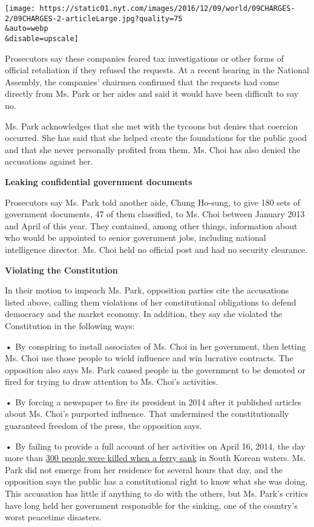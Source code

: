\texttt{[image: https://static01.nyt.com/images/2016/12/09/world/09CHARGES-2/09CHARGES-2-articleLarge.jpg?quality=75\\\&auto=webp\\\&disable=upscale]}

Prosecutors say these companies feared tax investigations or other forms
of official retaliation if they refused the requests. At a recent
hearing in the National Assembly, the companies' chairmen confirmed that
the requests had come directly from Ms. Park or her aides and said it
would have been difficult to say no.

Ms. Park acknowledges that she met with the tycoons but denies that
coercion occurred. She has said that she helped create the foundations
for the public good and that she never personally profited from them.
Ms. Choi has also denied the accusations against her.

\textbf{Leaking confidential government documents}

Prosecutors say Ms. Park told another aide, Chung Ho-sung, to give 180
sets of government documents, 47 of them classified, to Ms. Choi between
January 2013 and April of this year. They contained, among other things,
information about who would be appointed to senior government jobs,
including national intelligence director. Ms. Choi held no official post
and had no security clearance.

\textbf{Violating the Constitution}

In their motion to impeach Ms. Park, opposition parties cite the
accusations listed above, calling them violations of her constitutional
obligations to defend democracy and the market economy. In addition,
they say she violated the Constitution in the following ways:

\textbf{•} By conspiring to install associates of Ms. Choi in her
government, then letting Ms. Choi use those people to wield influence
and win lucrative contracts. The opposition also says Ms. Park caused
people in the government to be demoted or fired for trying to draw
attention to Ms. Choi's activities.

\textbf{•} By forcing a newspaper to fire its president in 2014 after it
published articles about Ms. Choi's purported influence. That undermined
the constitutionally guaranteed freedom of the press, the opposition
says.

\textbf{•} By failing to provide a full account of her activities on
April 16, 2014, the day more than
\href{http://www.nytimes.com/2015/04/12/world/asia/legacy-of-south-korea-sewol-ferry-sinking.html}{300
people were killed when a ferry sank} in South Korean waters. Ms. Park
did not emerge from her residence for several hours that day, and the
opposition says the public has a constitutional right to know what she
was doing. This accusation has little if anything to do with the others,
but Ms. Park's critics have long held her government responsible for the
sinking, one of the country's worst peacetime disasters.

